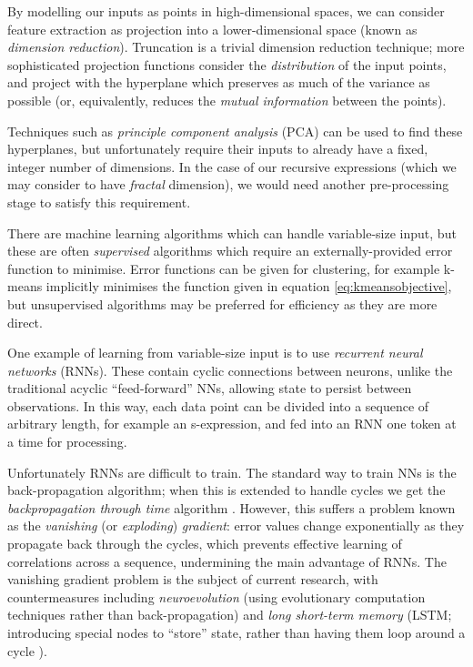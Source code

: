 By modelling our inputs as points in high-dimensional spaces, we can consider feature extraction as projection into a lower-dimensional space (known as \emph{dimension reduction}). Truncation is a trivial dimension reduction technique; more sophisticated projection functions consider the \emph{distribution} of the input points, and project with the hyperplane which preserves as much of the variance as possible (or, equivalently, reduces the \emph{mutual information} between the points).

Techniques such as \emph{principle component analysis} (PCA) can be used to find these hyperplanes, but unfortunately require their inputs to already have a fixed, integer number of dimensions. In the case of our recursive expressions (which we may consider to have \emph{fractal} dimension), we would need another pre-processing stage to satisfy this requirement.

There are machine learning algorithms which can handle variable-size input, but these are often \emph{supervised} algorithms which require an externally-provided error function to minimise. Error functions can be given for clustering, for example k-means implicitly minimises the function given in equation \ref{eq:kmeansobjective}, but unsupervised algorithms may be preferred for efficiency as they are more direct.

One example of learning from variable-size input is to use \emph{recurrent neural networks} (RNNs). These contain cyclic connections between neurons, unlike the traditional acyclic ``feed-forward'' NNs, allowing state to persist between observations. In this way, each data point can be divided into a sequence of arbitrary length, for example an s-expression, and fed into an RNN one token at a time for processing.

Unfortunately RNNs are difficult to train. The standard way to train NNs is the back-propagation algorithm; when this is extended to handle cycles we get the \emph{backpropagation through time} algorithm \citep{werbos1990backpropagation}. However, this suffers a problem known as the \emph{vanishing} (or \emph{exploding}) \emph{gradient}: error values change exponentially as they propagate back through the cycles, which prevents effective learning of correlations across a sequence, undermining the main advantage of RNNs. The vanishing gradient problem is the subject of current research, with countermeasures including \emph{neuroevolution} (using evolutionary computation techniques rather than back-propagation) and \emph{long short-term memory} (LSTM; introducing special nodes to ``store'' state, rather than having them loop around a cycle \citep{hochreiter1997long}).

